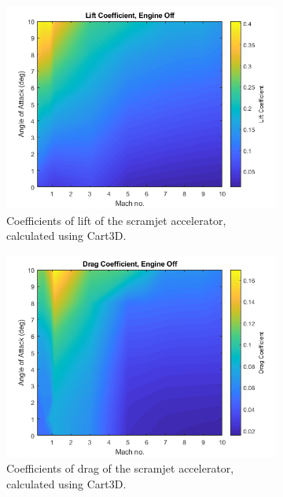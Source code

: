 \begin{figure}[ht]
	\begin{subfigure}{.5\textwidth}
		\centering
		\includegraphics[width=0.99\linewidth]{figures/3_vehicle_design/Cl}
		\caption{Coefficients of lift of the scramjet accelerator, calculated using Cart3D.}
		\label{fig:Cl}
	\end{subfigure}
	\begin{subfigure}{.5\textwidth}
		\centering
		\includegraphics[width=0.99\linewidth]{figures/3_vehicle_design/Cd}
		\caption{Coefficients of drag of the scramjet accelerator, calculated using Cart3D.}
		\label{fig:Cd}
	\end{subfigure}
	\begin{subfigure}{.5\textwidth}

\end{subfigure}
\end{figure}
